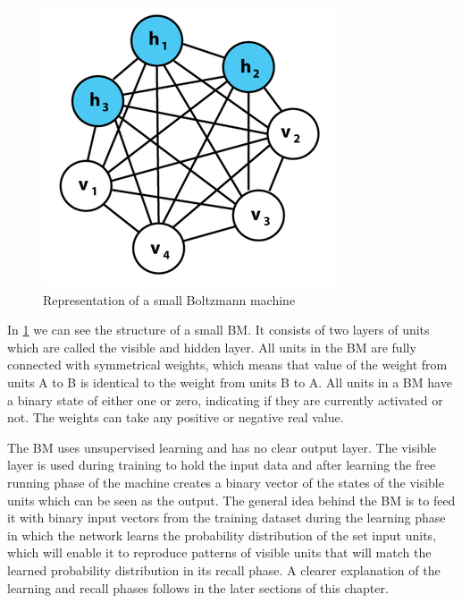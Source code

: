 \documentclass[12pt,twoside]{article}
\theoremstyle{plain}
\theoremstyle{definition}
\theoremstyle{remark}
\begin{document}
\begin{figure}[h]
	\centering
	\includegraphics[height=0.2\textheight]{src/boltzmann_graph}
	\caption[Representation of a small Boltzmann machine]{Representation of a small Boltzmann machine\footnotemark}
	\label{fig:boltzmann-graph}
\end{figure}

\noindent
In \cref{fig:boltzmann-graph} we can see the structure of a small BM. It consists of two layers of units which are called the visible and hidden layer.
All units in the BM are fully connected with symmetrical weights, which means that value of the weight from units A to B is identical to
the weight from units B to A. All units in a BM have a binary state of either one or zero, indicating if they are currently activated or not.
The weights can take any positive or negative real value.

The BM uses unsupervised learning and has no clear output layer. The visible layer is used during training to hold the input data and
after learning the free running phase of the machine creates a binary vector of the states of the visible units which can be seen as the output.
The general idea behind the BM is to feed it with binary input vectors from the training dataset during the learning phase
in which the network learns the probability distribution of the set input units, which will enable it to reproduce patterns of visible units
that will match the learned probability distribution in its recall phase. A clearer explanation of the learning and recall phases follows in the 
later sections of this chapter.
\end{document}
